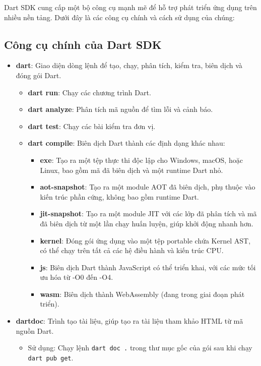 \documentclass[../DoAn.tex]{subfiles}
\numberwithin{figure}{chapter}
\begin{document}
Dart SDK cung cấp một bộ công cụ mạnh mẽ để hỗ trợ phát triển ứng dụng trên nhiều nền tảng. Dưới đây là các công cụ chính và cách sử dụng của chúng:

\subsection{Công cụ chính của Dart SDK}

\begin{itemize}
    \item \textbf{dart}: Giao diện dòng lệnh để tạo, chạy, phân tích, kiểm tra, biên dịch và đóng gói Dart.
    \begin{itemize}
        \item \textbf{dart run}: Chạy các chương trình Dart.
        \item \textbf{dart analyze}: Phân tích mã nguồn để tìm lỗi và cảnh báo.
        \item \textbf{dart test}: Chạy các bài kiểm tra đơn vị.
        \item \textbf{dart compile}: Biên dịch Dart thành các định dạng khác nhau:
        \begin{itemize}
            \item \textbf{exe}: Tạo ra một tệp thực thi độc lập cho Windows, macOS, hoặc Linux, bao gồm mã đã biên dịch và một runtime Dart nhỏ.
            \item \textbf{aot-snapshot}: Tạo ra một module AOT đã biên dịch, phụ thuộc vào kiến trúc phần cứng, không bao gồm runtime Dart.
            \item \textbf{jit-snapshot}: Tạo ra một module JIT với các lớp đã phân tích và mã đã biên dịch từ một lần chạy huấn luyện, giúp khởi động nhanh hơn.
            \item \textbf{kernel}: Đóng gói ứng dụng vào một tệp portable chứa Kernel AST, có thể chạy trên tất cả các hệ điều hành và kiến trúc CPU.
            \item \textbf{js}: Biên dịch Dart thành JavaScript có thể triển khai, với các mức tối ưu hóa từ -O0 đến -O4.
            \item \textbf{wasm}: Biên dịch thành WebAssembly (đang trong giai đoạn phát triển).
        \end{itemize}
    \end{itemize}
    \item \textbf{dartdoc}: Trình tạo tài liệu, giúp tạo ra tài liệu tham khảo HTML từ mã nguồn Dart.
    \begin{itemize}
        \item Sử dụng: Chạy lệnh \texttt{dart doc .} trong thư mục gốc của gói sau khi chạy \texttt{dart pub get}.

\end{itemize}
\end{itemize}
\end{document}
